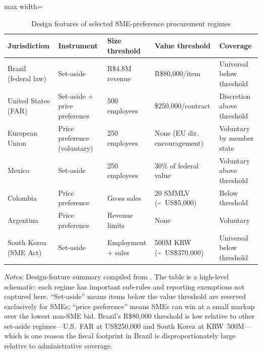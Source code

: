 \documentclass[12pt]{article}
\begin{document}
\begin{table}[htbp]
\centering
\caption{Design features of selected SME-preference procurement regimes}
\label{tab:cross_country}
\begin{adjustbox}{max width=\textwidth}
\begin{threeparttable}
\small
\begin{tabular}{lllll}
\toprule
Jurisdiction & Instrument & Size threshold & Value threshold & Coverage \\
\midrule
Brazil (federal law) & Set-aside   & R\$4.8M revenue     & R\$80{,}000/item   & Universal below threshold \\
United States (FAR)  & Set-aside + price preference & 500 employees & \$250{,}000/contract & Discretion above threshold \\
European Union       & Price preference (voluntary) & 250 employees & None (EU dir. encouragement) & Voluntary by member state \\
Mexico               & Set-aside   & 250 employees       & 30\% of federal value & Voluntary above threshold \\
Colombia             & Price preference & Gross sales     & 20 SMMLV (\textasciitilde~US\$5{,}000) & Below threshold \\
Argentina            & Price preference & Revenue limits  & None           & Voluntary \\
South Korea (SME Act)& Set-aside   & Employment + sales  & 500M KRW (\textasciitilde~US\$370{,}000) & Universal below threshold \\
\bottomrule
\end{tabular}
\begin{tablenotes}
\small
\item \textit{Notes:} Design-feature summary compiled from
\citet{oecd2018,sigma2016,hoekman2020,loader2013,loader2015,pwc2014,thai2017}.
The table is a high-level schematic: each regime has important sub-rules
and reporting exemptions not captured here. ``Set-aside'' means items
below the value threshold are reserved exclusively for SMEs; ``price
preference'' means SMEs can win at a small markup over the lowest
non-SME bid. Brazil's R\$80{,}000 threshold is low relative to other
set-aside regimes---U.S.\ FAR at US\$250{,}000 and South Korea at
KRW~500M---which is one reason the fiscal footprint in Brazil is
disproportionately large relative to administrative coverage.
\end{tablenotes}
\end{threeparttable}
\end{adjustbox}
\end{table}

\clearpage



\end{document}
